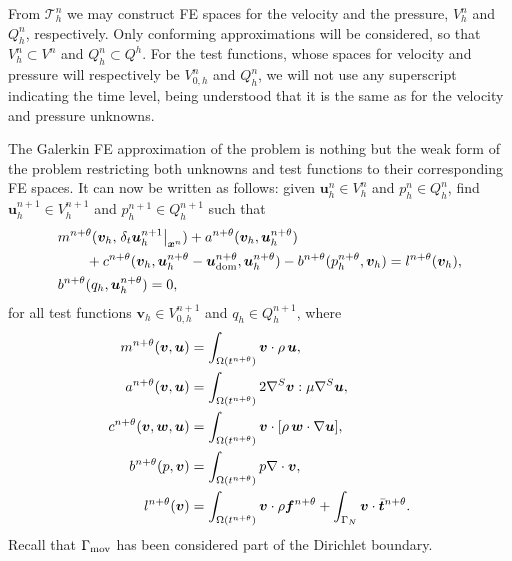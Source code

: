 \documentclass[11pt,a4paper,oneside,reqno]{amsart}
\newcommand{\sbm}[1]  {\mbox{{\boldmath{$\scriptstyle{#1}$}}}}
\def\u{{\bm u}}
\def\cl{\nonumber\\}
\def\el{{\nonumber}}
\def\vt{\bm v}
\begin{document}
From ${\mathcal{T}}_h^{n}$ we may construct FE spaces for the velocity and the pressure, $V^n_h$ and $Q^n_h$, respectively. Only conforming approximations will be considered, so that $V^n_h\subset V^n$ and $Q^n_h\subset Q^h$. For the test functions, whose spaces for velocity and pressure will respectively be $V^n_{0,h}$ and $Q^n_h$, we will not use any superscript indicating the time level, being understood that it is the same as for the velocity and pressure unknowns. 

The Galerkin FE approximation of the problem is nothing but the weak form of the problem restricting both unknowns and test functions to their corresponding FE spaces. It can now be written as follows: given $\u^n_h\in V^n_h$ and $p^n_h\in Q^n_h$, find $\u^{n+1}_h\in V^{n+1}_h$ and $p^{n+1}_h\in Q^{n+1}_h$ such that
\begin{align}
& m^{n+\theta}( \vt_h , \left. \delta_t\u_h^{n+1}\right\vert_{{\sbm x}^n})
+ a^{n+\theta}( \vt_h , \u_h^{n+\theta}) \cl
&\qquad + c^{n+\theta} (\vt_h ,  \u_h^{n+\theta}-{\u_{\rm dom}^{n+\theta}} , \u_h^{n+\theta})
- b^{n+\theta}( p_h^{n+\theta} ,\vt_h) 
 = l^{n+\theta} (\vt_h) , \label{eq:fl1}\\
&b^{n+\theta} ( q_h , \u_h^{n+\theta} ) = 0,\label{eq:fl2}
\end{align}
for all test functions $\vt_h\in V^{n+1}_{0,h}$ and $q_h\in Q^{n+1}_h$, where
\begin{align}
m^{n+\theta}(\vt,\u) & =  \int_{\Omega(t^{n+\theta})} \vt \cdot \rho\, \u, \cl
a^{n+\theta}(\vt,\u) & = \int_{\Omega(t^{n+\theta})} 2 \nabla^S\vt : \mu \nabla^S\u , \cl
c^{n+\theta}(\vt,{\bm w},\u) & = \int_{\Omega(t^{n+\theta})} \vt\cdot [\rho\, {\bm w}\cdot\nabla\u],\cl
b^{n+\theta} (p,\vt) & = \int_{\Omega(t^{n+\theta})}  p \nabla\cdot\vt , \cl
l^{n+\theta} (\vt)& = \int_{\Omega(t^{n+\theta})} \vt  \cdot \rho {\bm f^{n+\theta}} 
+ \int_{\Gamma_N} \vt \cdot {\bar{\bm t}^{n+\theta}}.\el
\end{align}
Recall that $\Gamma_{\rm mov}$ has been considered part of the Dirichlet boundary.
\end{document}
